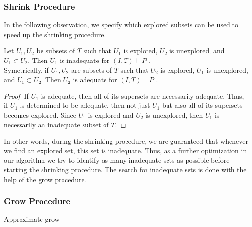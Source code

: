 \subsubsection{Shrink Procedure}
\label{sec:shrink}

\iffalse
We can effectively use the set  \textit{Explored} for speeding up the shrinking procedure. When testing the set $U \setminus \{T_i\}$ (see line 2 in Algorithm~\ref{shrink-procedure}) we first check whether  $U \setminus \{T_i\}$ is explored. If so, the status of  $U \setminus \{T_i\}$ is known and no test for adequacy is needed.
\fi

In the following observation, we specify which explored subsets can be used to speed up the shrinking procedure.


\begin{observation}
\label{observation:explored-property}
Let $U_1, U_2$ be subsets of $T$ such that $U_1$ is explored, $U_2$ is unexplored, and $U_1 \subset U_2$. Then $U_1$ is inadequate  for $(I, T) \vdash P$ .\\
Symetrically, if $U_1, U_2$ are subsets of $T$ such that $U_2$ is explored, $U_1$ is unexplored, and $U_1 \subset U_2$. Then $U_2$ is adequate  for $(I, T) \vdash P$ .
\end{observation}

\begin{proof}
If $U_1$ is adequate, then all of its supersets are necessarily adequate. Thus, if $U_1$ is determined to be adequate, then not just $U_1$ but also all of its supersets becomes explored. Since $U_1$ is explored and $U_2$ is unexplored, then $U_1$ is necessarily an inadequate subset of $T$.
\end{proof}

In other words, during the shrinking procedure, we are guaranteed that whenever we find an explored set, this set is inadequate.
Thus, as a further optimization in our algorithm we try to identify as many inadequate sets as possible before starting the shrinking procedure.
The search for inadequate sets is done with the help  of the grow procedure.






\subsubsection{Grow Procedure}\label{sec:grow}
\begin{algorithm}[!t]
\begin{small}

\caption{Approximate grow}
\label{approx-grow}
\end{small}
\end{algorithm}

